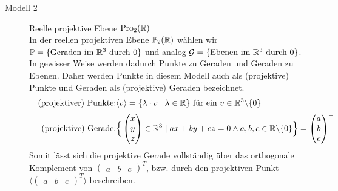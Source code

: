 \begin{description}
      \item[Modell 2] Reelle projektive Ebene $\operatorname{Pro}_2(\mathbb R)$ \label{Desargues-ReelleProjektiveEbene} \\
          In der reellen projektiven Ebene $\mathbb{P}_2(\mathbb R)$ wählen wir
          $\mathbb{P} = \{ \mbox{Geraden im $\mathbb R^3$ durch $0$} \}$ und analog
          $\mathcal{G} = \{ \mbox{Ebenen im $\mathbb R^3$ durch $0$} \}$. In gewisser Weise werden dadurch
          Punkte zu Geraden und Geraden zu Ebenen. Daher werden Punkte in diesem Modell auch als
          (projektive) Punkte und Geraden als (projektive) Geraden bezeichnet.
          \begin{align*}
              &&\text{(projektiver) Punkte:} &
                  \langle v \rangle = \{ \lambda \cdot v \mid \lambda \in \mathbb R \} \text{ für ein } v\in \mathbb R^3 \backslash \{ 0 \} \\
              &&\text{(projektive) Gerade:} &
                  \Big\{ \begin{pmatrix} x \\ y \\ z\end{pmatrix} \in \mathbb R^3
                  \mid ax + by + cz = 0 \wedge a,b,c \in \mathbb R\backslash \{0\} \Big\} =
                  \begin{pmatrix} a \\ b \\ c\end{pmatrix}^\perp
          \end{align*}
          Somit lässt sich die projektive Gerade vollständig über das orthogonale Komplement
          von $\begin{pmatrix} a & b & c\end{pmatrix}^T$, bzw. durch den projektiven Punkt
          $\langle \begin{pmatrix} a & b & c\end{pmatrix}^T \rangle$ beschreiben.
  \end{description}




